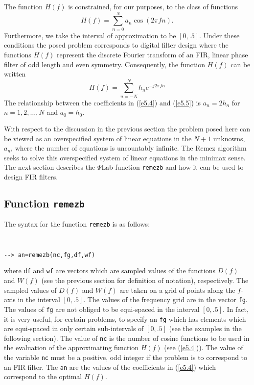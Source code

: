 	The function $H(f)$ is 
constrained, for our purposes, to the class of 
functions
%
\begin{equation}
H(f)=\sum_{n=0}^{N}a_n\cos(2\pi fn).
\label{e5.4}
\end{equation}
%
Furthermore, we take the interval of approximation to
be $[0,.5]$.  Under these conditions the posed problem
corresponds to digital filter design where the functions
$H(f)$ represent the discrete Fourier transform of an
FIR, linear phase filter of odd length and even symmetry.
Consequently, the function $H(f)$ can be written
%
\begin{equation}
H(f)=\sum_{n=-N}^{N}h_n e^{-j2\pi fn}
\label{e5.5}
\end{equation}
%
The relationship between the 
coefficients in (\ref{e5.4}) and (\ref{e5.5})
is $a_n=2h_n$ for $n=1,2,\ldots,N$ and $a_0=h_0$.

   With respect to the discussion in the previous section the problem
posed here can be viewed as an overspecified system
of linear equations in the  $N+1$ unknowns, $a_n$, where the
number of equations is uncountably infinite.  The Remez
algorithm seeks to solve this overspecified system of linear equations
in the minimax sense.  The next section describes the $\Psi$Lab
function {\tt remezb} and how it can be used to design FIR filters.

\subsection{Function {\tt remezb}}

	The syntax for the function {\tt remezb} is as 
follows:
{\tt
\begin{verbatim}
--> an=remezb(nc,fg,df,wf)
\end{verbatim}}
\noindent where {\tt df} and {\tt wf} are vectors which are sampled values
of the functions $D(f)$ and $W(f)$ (see the previous section for definition
of notation), respectively.  The sampled
values of $D(f)$ and $W(f)$ are taken on a grid of points
along the $f$-axis in the interval $[0,.5]$.
The values of the frequency grid are in the vector 
{\tt fg}.  
The values of {\tt fg} are not obliged to be equi-spaced in the interval
$[0,.5]$.  In fact,
it is very useful, for certain problems, to specify an
{\tt fg} which has elements which are equi-spaced in only certain
sub-intervals of $[0,.5]$ (see the examples in the following section).
The value of {\tt nc} is the number
of cosine functions to be used in the
evaluation of the approximating function
$H(f)$ (see (\ref{e5.4})).  
The value of the variable {\tt nc} must be a positive, odd integer
if the problem is to correspond to an FIR filter.
The {\tt an} are the values of the
coefficients in (\ref{e5.4}) which correspond to the optimal
$H(f)$.

